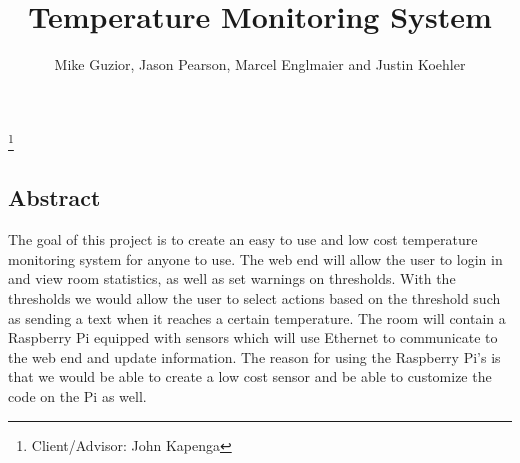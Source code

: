 \documentclass{report}
\begin{document}
\begin{titlepage}

\vspace*{\fill}
\begin{center}
\title{Temperature Monitoring System}
\author{Mike Guzior, Jason Pearson, Marcel Englmaier and Justin Koehler}
\thanks{Client/Advisor: John Kapenga}
\end{center}
\vspace*{\fill}
\end{titlepage}
\newpage
\maketitle
\tableofcontents
\newpage

\subsection*{Abstract}
The goal of this project is to create an easy to use and low cost temperature monitoring system for anyone to use. 
The web end will allow the user to login in and view room statistics, as well as set warnings on thresholds. 
With the thresholds we would allow the user to select actions based on the threshold such as sending a text when it reaches a certain temperature. 
The room will contain a Raspberry Pi equipped with sensors which will use Ethernet to communicate to the web end and update information. 
The reason for using the Raspberry Pi’s is that we would be able to create a low cost sensor and be able to customize the code on the Pi as well. 
\newpage
\end{document}
